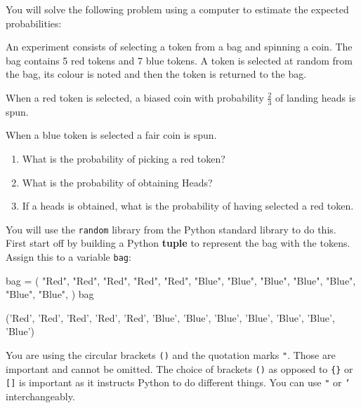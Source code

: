 You will solve the following problem using a computer to estimate the expected
probabilities:

An experiment consists of selecting a token from a bag and spinning a coin. The
bag contains 5 red tokens and 7 blue tokens. A token is selected at random from
the bag, its colour is noted and then the token is returned to the bag.


When a red token is selected, a biased coin with probability \(\frac{2}{3}\)
of landing heads is spun.


When a blue token is selected a fair coin is spun.
\begin{enumerate}

\item 

What is the probability of picking a red token?

\item 

What is the probability of obtaining Heads?

\item 

If a heads is obtained, what is the probability of having selected a red
token.

\end{enumerate}



You will use the \texttt{random} library from the Python standard library to do this.
First start off by building a Python \textbf{tuple} to represent the bag with the
tokens. Assign this to a variable \texttt{bag}:


\begin{pyin}
bag = (
    "Red",
    "Red",
    "Red",
    "Red",
    "Red",
    "Blue",
    "Blue",
    "Blue",
    "Blue",
    "Blue",
    "Blue",
    "Blue",
)
bag
\end{pyin}





\begin{raw}
('Red',
 'Red',
 'Red',
 'Red',
 'Red',
 'Blue',
 'Blue',
 'Blue',
 'Blue',
 'Blue',
 'Blue',
 'Blue')
\end{raw}






\begin{note}
You are using the circular brackets \texttt{()} and the quotation marks
\texttt{"}. Those are important and cannot be omitted. The choice of brackets
\texttt{()} as opposed to \texttt{\{\}} or \texttt{[]} is important as it instructs Python to do
different things. You can use \texttt{"} or \texttt{'}
interchangeably.
\end{note}



